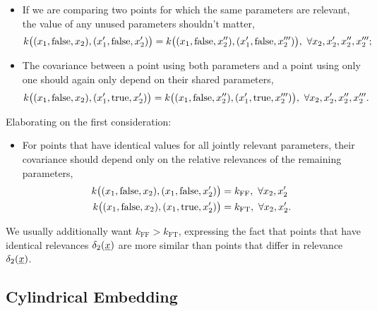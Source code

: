 \documentclass{article}
\newcommand{\vect}[1]{\underline{\smash{#1}}}
\renewcommand{\v}[1]{\vect{#1}}
\begin{document}
\begin{itemize}
\item If we are comparing two points for which the same parameters are relevant, the value of any unused parameters shouldn't matter,  
\begin{equation}
 k\bigl((x_1, \textnormal{false}, x_2), (x_1', \textnormal{false}, x_2') \bigr)
= k\bigl((x_1, \textnormal{false}, x_2''), (x_1', \textnormal{false}, x_2''')\bigr),\ 
\forall x_2, x_2', x_2'', x_2''';
\end{equation}
\item The covariance between a point using both parameters and a point using only one should again only depend on their shared parameters,
\begin{equation}
 k\bigl((x_1, \textnormal{false}, x_2), (x_1', \textnormal{true}, x_2') \bigr)
= k\bigl((x_1, \textnormal{false}, x_2''), (x_1', \textnormal{true}, x_2''')\bigr),\ 
\forall x_2, x_2', x_2'', x_2'''.
\end{equation}
\end{itemize}

Elaborating on the first consideration:

\begin{itemize}
\item For points that have identical values for all jointly relevant parameters, their covariance should depend only on the relative relevances of the remaining parameters,
\begin{align}
 k\bigl((x_1, \textnormal{false}, x_2), (x_1, \textnormal{false}, x_2') \bigr)
& = k_{\text{FF}},\ \forall x_2, x_2'\\
 k\bigl((x_1, \textnormal{false}, x_2), (x_1, \textnormal{true}, x_2') \bigr)
& = k_{\text{FT}},\ \forall x_2, x_2'.
\end{align}
\end{itemize}
We usually additionally want $k_{\text{FF}}>k_{\text{FT}}$, expressing the fact that points that have identical relevances $\delta_2({\v{x}})$ are more similar than points that differ in relevance $\delta_2({\v{x}})$.


\subsection{Cylindrical Embedding}
\end{document}
